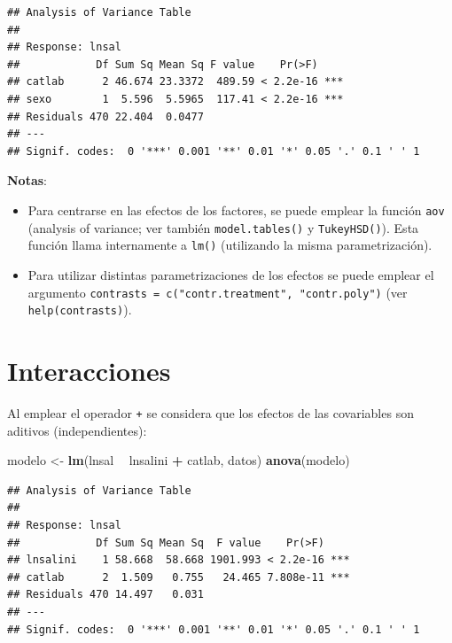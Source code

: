 \documentclass[]{book}
\newenvironment{Shaded}{\begin{snugshade}}{\end{snugshade}}
\newcommand{\KeywordTok}[1]{\textcolor[rgb]{0.13,0.29,0.53}{\textbf{#1}}}
\newcommand{\StringTok}[1]{\textcolor[rgb]{0.31,0.60,0.02}{#1}}
\newcommand{\OperatorTok}[1]{\textcolor[rgb]{0.81,0.36,0.00}{\textbf{#1}}}
\newcommand{\NormalTok}[1]{#1}
\begin{document}
\begin{verbatim}
## Analysis of Variance Table
## 
## Response: lnsal
##            Df Sum Sq Mean Sq F value    Pr(>F)    
## catlab      2 46.674 23.3372  489.59 < 2.2e-16 ***
## sexo        1  5.596  5.5965  117.41 < 2.2e-16 ***
## Residuals 470 22.404  0.0477                      
## ---
## Signif. codes:  0 '***' 0.001 '**' 0.01 '*' 0.05 '.' 0.1 ' ' 1
\end{verbatim}

\textbf{Notas}:

\begin{itemize}
\item
  Para centrarse en las efectos de los factores, se puede emplear la
  función \texttt{aov} (analysis of variance; ver también
  \texttt{model.tables()} y \texttt{TukeyHSD()}). Esta función llama
  internamente a \texttt{lm()} (utilizando la misma parametrización).
\item
  Para utilizar distintas parametrizaciones de los efectos se puede
  emplear el argumento
  \texttt{contrasts\ =\ c("contr.treatment",\ "contr.poly")} (ver
  \texttt{help(contrasts)}).
\end{itemize}

\section{Interacciones}\label{interacciones}

Al emplear el operador \texttt{+} se considera que los efectos de las
covariables son aditivos (independientes):

\begin{Shaded}
\begin{Highlighting}[]
\NormalTok{modelo <-}\StringTok{ }\KeywordTok{lm}\NormalTok{(lnsal }\OperatorTok{~}\StringTok{ }\NormalTok{lnsalini }\OperatorTok{+}\StringTok{ }\NormalTok{catlab, datos)}
\KeywordTok{anova}\NormalTok{(modelo)}
\end{Highlighting}
\end{Shaded}

\begin{verbatim}
## Analysis of Variance Table
## 
## Response: lnsal
##            Df Sum Sq Mean Sq  F value    Pr(>F)    
## lnsalini    1 58.668  58.668 1901.993 < 2.2e-16 ***
## catlab      2  1.509   0.755   24.465 7.808e-11 ***
## Residuals 470 14.497   0.031                       
## ---
## Signif. codes:  0 '***' 0.001 '**' 0.01 '*' 0.05 '.' 0.1 ' ' 1
\end{verbatim}
\end{document}
